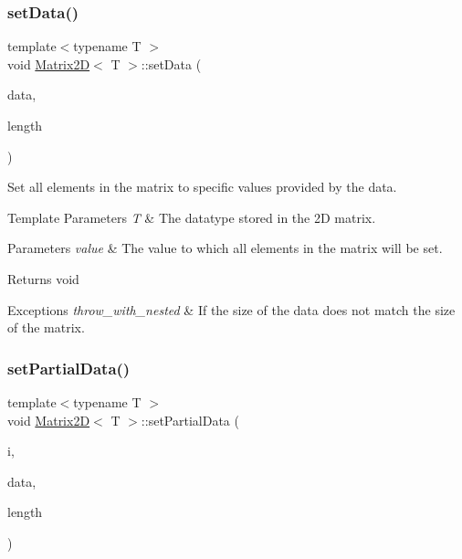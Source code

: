 \subsubsection{\texorpdfstring{set\+Data()}{setData()}}
{\footnotesize\ttfamily template$<$typename T $>$ \\
void \mbox{\hyperlink{classMatrix2D}{Matrix2D}}$<$ T $>$\+::set\+Data (\begin{DoxyParamCaption}\item[{T $\ast$}]{data,  }\item[{int}]{length }\end{DoxyParamCaption})}



Set all elements in the matrix to specific values provided by the data. 


\begin{DoxyTemplParams}{Template Parameters}
{\em T} & The datatype stored in the 2D matrix. \\
\hline
\end{DoxyTemplParams}

\begin{DoxyParams}{Parameters}
{\em value} & The value to which all elements in the matrix will be set.\\
\hline
\end{DoxyParams}
\begin{DoxyReturn}{Returns}
void
\end{DoxyReturn}

\begin{DoxyExceptions}{Exceptions}
{\em throw\+\_\+with\+\_\+nested} & If the size of the data does not match the size of the matrix. \\
\hline
\end{DoxyExceptions}
\mbox{\label{classMatrix2D_a2a0f91e493892f9c56e98d1e20dcd465}} 
\subsubsection{\texorpdfstring{set\+Partial\+Data()}{setPartialData()}}
{\footnotesize\ttfamily template$<$typename T $>$ \\
void \mbox{\hyperlink{classMatrix2D}{Matrix2D}}$<$ T $>$\+::set\+Partial\+Data (\begin{DoxyParamCaption}\item[{int}]{i,  }\item[{T $\ast$}]{data,  }\item[{unsigned long}]{length }\end{DoxyParamCaption})}



